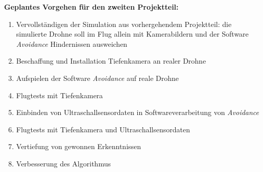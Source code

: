 
\textbf{Geplantes Vorgehen für den zweiten Projektteil:}
\begin{enumerate}
    \item Vervollständigen der Simulation aus vorhergehendem Projektteil: die simulierte Drohne soll im Flug allein mit Kamerabildern und der Software \textit{Avoidance} Hindernissen ausweichen 
    \item Beschaffung und Installation Tiefenkamera an realer Drohne
    \item Aufspielen der Software \textit{Avoidance} auf reale Drohne
    \item Flugtests mit Tiefenkamera
    \item Einbinden von Ultraschallsensordaten in Softwareverarbeitung von \textit{Avoidance}
    \item Flugtests mit Tiefenkamera und Ultraschallsensordaten
    \item Vertiefung von gewonnen Erkenntnissen
    \item Verbesserung des Algorithmus
\end{enumerate}

